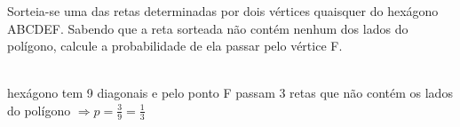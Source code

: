 \begin{ex}
Sorteia-se uma das retas determinadas por dois vértices quaisquer do hexágono ABCDEF. Sabendo que a reta sorteada não contém nenhum dos lados do polígono, calcule a probabilidade de ela passar pelo vértice F.
  \begin{sol}
   \phantom{A} \\
   hexágono tem 9 diagonais e pelo ponto F passam 3 retas que não contém os lados do polígono $\Longrightarrow p=\frac{3}{9}=\frac{1}{3}$
  \end{sol}

\end{ex}